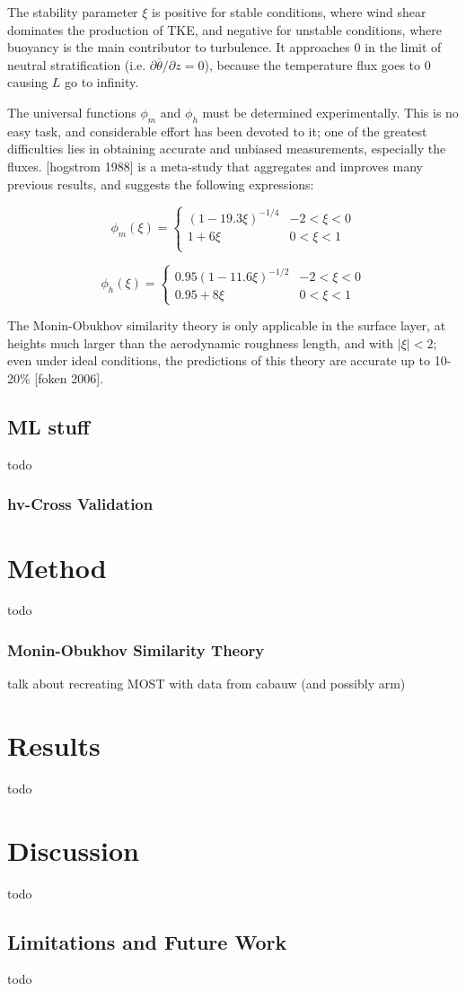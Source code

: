\documentclass[12pt]{book}
\begin{document}
The stability parameter $\xi$ is positive for stable conditions, where wind shear dominates the production of TKE, and negative for unstable conditions, where buoyancy is the main contributor to turbulence. It approaches 0 in the limit of neutral stratification (i.e. $\partial\overline{\theta}/\partial z=0$), because the temperature flux goes to 0 causing $L$ go to infinity.

The universal functions $\phi_m$ and $\phi_h$ must be determined experimentally. This is no easy task, and considerable effort has been devoted to it; one of the greatest difficulties lies in obtaining accurate and unbiased measurements, especially the fluxes. [hogstrom 1988] is a meta-study that aggregates and improves many previous results, and suggests the following expressions:

$$
\phi_m(\xi)=\begin{cases}
(1-19.3\xi)^{-1/4} & -2<\xi<0 \\
1+6\xi & 0<\xi<1\\
\end{cases}
$$

$$
\phi_h(\xi)=\begin{cases}
0.95(1-11.6\xi)^{-1/2} & -2<\xi<0 \\
0.95+8\xi & 0<\xi<1
\end{cases}
$$

The Monin-Obukhov similarity theory is only applicable in the surface layer, at heights much larger than the aerodynamic roughness length, and with $\vert\xi\vert<2$; even under ideal conditions, the predictions of this theory are accurate up to 10-20\% [foken 2006].

\section{ML stuff}
todo
\subsection{hv-Cross Validation}

\chapter{Method}
todo

\subsection{Monin-Obukhov Similarity Theory}
talk about recreating MOST with data from cabauw (and possibly arm)

\chapter{Results}
todo

\chapter{Discussion}
todo

\section{Limitations and Future Work}
todo



\end{document}
